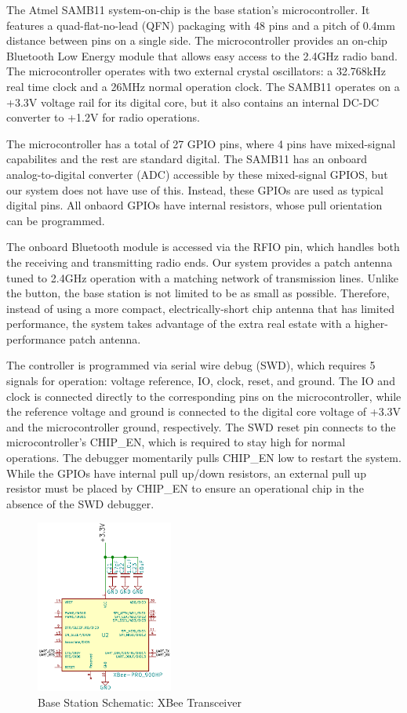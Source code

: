 \documentclass[journal,compsoc]{IEEEtran}
\begin{document}
The Atmel SAMB11 system-on-chip is the base station's microcontroller. It features a quad-flat-no-lead (QFN) packaging with 48 pins and a pitch of 0.4mm distance between pins on a single side. The microcontroller provides an on-chip Bluetooth Low Energy module that allows easy access to the 2.4GHz radio band. The microcontroller operates with two external crystal oscillators: a 32.768kHz real time clock and a 26MHz normal operation clock. The SAMB11 operates on a +3.3V voltage rail for its digital core, but it also contains an internal DC-DC converter to +1.2V for radio operations.

The microcontroller has a total of 27 GPIO pins, where 4 pins have mixed-signal capabilites and the rest are standard digital. The SAMB11 has an onboard analog-to-digital converter (ADC) accessible by these mixed-signal GPIOS, but our system does not have use of this. Instead, these GPIOs are used as typical digital pins. All onbaord GPIOs have internal resistors, whose pull orientation can be programmed.

The onboard Bluetooth module is accessed via the RFIO pin, which handles both the receiving and transmitting radio ends. Our system provides a patch antenna tuned to 2.4GHz operation with a matching network of transmission lines. Unlike the button, the base station is not limited to be as small as possible. Therefore, instead of using a more compact, electrically-short chip antenna that has limited performance, the system takes advantage of the extra real estate with a higher-performance patch antenna.

The controller is programmed via serial wire debug (SWD), which requires 5 signals for operation: voltage reference, IO, clock, reset, and ground. The IO and clock is connected directly to the corresponding pins on the microcontroller, while the reference voltage and ground is connected to the digital core voltage of +3.3V and the microcontroller ground, respectively. The SWD reset pin connects to the microcontroller's CHIP\_EN, which is required to stay high for normal operations. The debugger momentarily pulls CHIP\_EN low to restart the system. While the GPIOs have internal pull up/down resistors, an external pull up resistor must be placed by CHIP\_EN to ensure an operational chip in the absence of the SWD debugger.
\begin{figure}[ht] 	%
\centering
\includegraphics[width=0.4\textwidth]{base-schematic-xbee.png}
\caption{ \space Base Station Schematic: XBee Transceiver}
\label{base-sch-xbee}
\end{figure}
\end{document}
